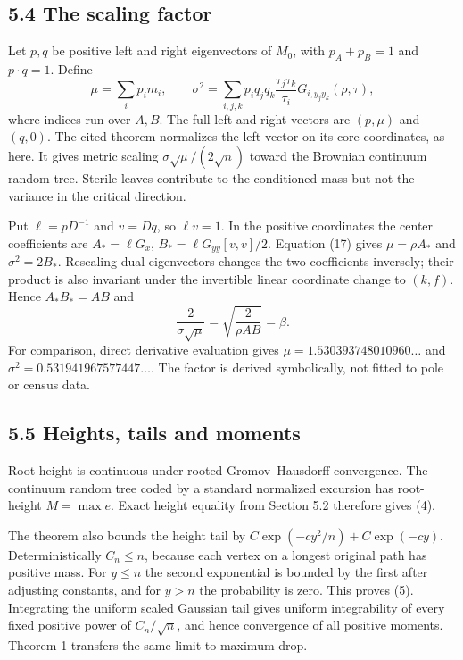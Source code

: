\documentclass[11pt,letterpaper]{article}
\begin{document}
\subsection{5.4 The scaling factor}\label{the-scaling-factor}

Let \(p,q\) be positive left and right eigenvectors of \(M_0\), with
\(p_A+p_B=1\) and \(p\cdot q=1\). Define \[
 \mu=\sum_i p_im_i,\qquad
 \sigma^2=\sum_{i,j,k}p_iq_jq_k\frac{\tau_j\tau_k}{\tau_i}
 G_{i,y_jy_k}(\rho,\tau),                                    \tag{17}
\] where indices run over \(A,B\). The full left and right vectors are
\((p,\mu)\) and \((q,0)\). The cited theorem normalizes the left vector
on its core coordinates, as here. It gives metric scaling
\(\sigma\sqrt\mu/(2\sqrt n)\) toward the Brownian continuum random tree.
Sterile leaves contribute to the conditioned mass but not the variance
in the critical direction.

Put \(\ell=pD^{-1}\) and \(v=Dq\), so \(\ell v=1\). In the positive
coordinates the center coefficients are \(A_*=\ell G_x\),
\(B_*=\ell G_{yy}[v,v]/2\). Equation (17) gives \(\mu=\rho A_*\) and
\(\sigma^2=2B_*\). Rescaling dual eigenvectors changes the two
coefficients inversely; their product is also invariant under the
invertible linear coordinate change to \((k,f)\). Hence \(A_*B_*=AB\)
and \[\frac2{\sigma\sqrt\mu}=\sqrt{\frac2{\rho AB}}=\beta.\] For
comparison, direct derivative evaluation gives
\(\mu=1.530393748010960\ldots\) and
\(\sigma^2=0.531941967577447\ldots\). The factor is derived
symbolically, not fitted to pole or census data.

\subsection{5.5 Heights, tails and
moments}\label{heights-tails-and-moments}

Root-height is continuous under rooted Gromov--Hausdorff convergence.
The continuum random tree coded by a standard normalized excursion has
root-height \(M=\max e\). Exact height equality from Section 5.2
therefore gives (4).

The theorem also bounds the height tail by
\(C\exp(-cy^2/n)+C\exp(-cy)\). Deterministically \(C_n\le n\), because
each vertex on a longest original path has positive mass. For \(y\le n\)
the second exponential is bounded by the first after adjusting
constants, and for \(y>n\) the probability is zero. This proves (5).
Integrating the uniform scaled Gaussian tail gives uniform integrability
of every fixed positive power of \(C_n/\sqrt n\), and hence convergence
of all positive moments. Theorem 1 transfers the same limit to maximum
drop.
\end{document}
